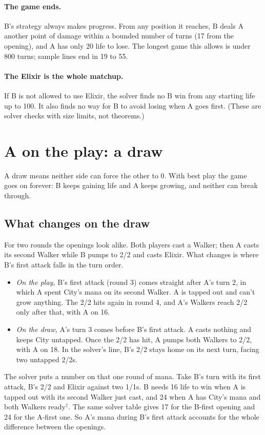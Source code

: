 \documentclass[11pt]{article}
\begin{document}
\paragraph{The game ends.} B's strategy always makes progress. From any
position it reaches, B deals A another point of damage within a bounded
number of turns (17 from the opening), and A has only 20 life to lose.
The longest game this allows is under 800 turns; sample lines end in 19
to 55.

\paragraph{The Elixir is the whole matchup.} If B is not allowed to use
Elixir, the solver finds no B win from any starting life up to 100. It
also finds no way for B to avoid losing when A goes first. (These are
solver checks with size limits, not theorems.)

\section{A on the play: a draw}

A draw means neither side can force the other to 0. With best play the
game goes on forever: B keeps gaining life and A keeps growing, and
neither can break through.

\subsection{What changes on the draw}
\label{sec:tempo}
For two rounds the openings look alike. Both players cast a Walker; then
A casts its second Walker while B pumps to 2/2 and casts Elixir. What
changes is where B's first attack falls in the turn order.
\begin{itemize}
\item \emph{On the play,} B's first attack (round 3) comes straight after
  A's turn 2, in which A spent City's mana on its second Walker. A is
  tapped out and can't grow anything. The 2/2 hits again in round 4,
  and A's Walkers reach 2/2 only after that, with A on 16.
\item \emph{On the draw,} A's turn 3 comes before B's first attack. A
  casts nothing and keeps City untapped. Once the 2/2 has hit, A pumps
  both Walkers to 2/2, with A on 18. In the solver's line, B's 2/2 stays
  home on its next turn, facing two untapped 2/2s.
\end{itemize}
The solver puts a number on that one round of mana. Take B's turn with
its first attack, B's 2/2 and Elixir against two 1/1s. B needs 16 life to
win when A is tapped out with its second Walker just cast, and 24 when A has City's mana and both Walkers
ready$^{\dagger}$. The same solver table gives 17 for the B-first opening
and 24 for the A-first one. So A's mana during B's first attack accounts
for the whole difference between the openings.
\end{document}
